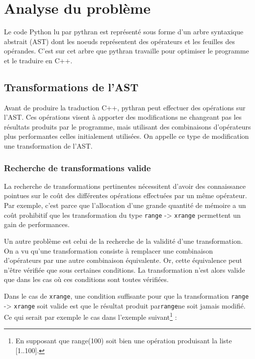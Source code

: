 \documentclass[a4paper]{article}
\begin{document}
\section{Analyse du problème}

Le code Python lu par pythran est représenté sous forme d'un arbre
syntaxique abstrait (AST) dont les noeuds représentent des opérateurs
et les feuilles des opérandes. C'est sur cet arbre que pythran
travaille pour optimiser le programme et le traduire en C++.

\subsection{Transformations de l'AST}

Avant de produire la traduction C++, pythran peut effectuer des
opérations sur l'AST. Ces opérations visent à apporter des
modifications ne changeant pas les résultats produits par le
programme, mais utilisant des combinaisons d'opérateurs plus
performantes celles initialement utilisées. On appelle ce type de
modification une transformation de l'AST.

\subsubsection{Recherche de transformations valide}

La recherche de transformations pertinentes nécessitent d'avoir des
connaissance pointues sur le coût des différentes opérations
effectuées par un même opérateur. Par exemple, c'est parce que
l'allocation d'une grande quantité de mémoire a un coût prohibitif que
les transformation du type \texttt{range} -> \texttt{xrange}
permettent un gain de performances.

Un autre problème est celui de la recherche de la validité d'une
transformation. On a vu qu'une transformation consiste à remplacer une
combinaison d'opérateurs par une autre combinaison équivalente. Or,
cette équivalence peut n'être vérifiée que sous certaines
conditions. La transformation n'est alors valide que dans les cas où
ces conditions sont toutes vérifiées.

Dans le cas de \texttt{xrange}, une condition suffisante pour que la
transformation \texttt{range} -> \texttt{xrange} soit valide est que le résultat produit
par\texttt{range}ne soit jamais modifié. Ce qui serait par exemple le cas
dans l'exemple suivant\footnote{En supposant que range(100) soit bien
  une opération produisant la liste [1..100].} :
\end{document}
